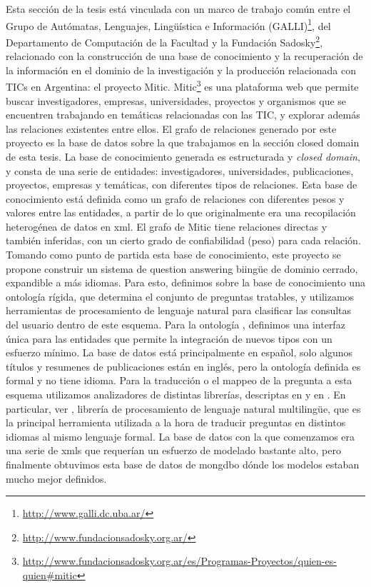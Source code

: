 Esta sección de la tesis está vinculada con un marco de trabajo común entre el
Grupo de Autómatas, Lenguajes, Lingüística e Información (GALLI)\footnote{\url{http://www.galli.dc.uba.ar/}}, 
del Departamento de Computación de la Facultad y la Fundación Sadosky\footnote{\url{http://www.fundacionsadosky.org.ar/}}, relacionado con la construcción de una base de conocimiento
 y la recuperación de la información en el dominio de la investigación y la
producción relacionada con TICs en Argentina: el proyecto Mitic.
Mitic\footnote{\url{http://www.fundacionsadosky.org.ar/es/Programas-Proyectos/quien-es-quien\#mitic}} es una plataforma web que permite buscar investigadores, empresas, universidades, proyectos y organismos que se encuentren trabajando en temáticas relacionadas con las TIC, y explorar además las relaciones existentes entre ellos. El grafo de relaciones generado por este proyecto es la base de datos sobre la que trabajamos en la sección closed domain de esta tesis.
La base de conocimiento generada es estructurada y \textit{closed domain}, y consta de
una serie de entidades: investigadores, universidades, publicaciones,
proyectos, empresas y temáticas, con diferentes tipos de relaciones.
Esta base de conocimiento está definida como un grafo de relaciones con diferentes pesos y valores entre
las entidades, a partir de lo que originalmente era una
recopilación heterogénea de datos en xml. El grafo de Mitic
tiene relaciones directas y también inferidas, con un cierto grado
de confiabilidad (peso) para cada relación. Tomando como punto de
partida esta base de conocimiento, este proyecto se propone construir
un sistema de question answering biingüe de dominio cerrado, expandible a más idiomas.
Para esto, definimos sobre la base de conocimiento una ontología
rígida, que determina el conjunto de preguntas tratables, y
utilizamos herramientas de procesamiento de lenguaje natural para
clasificar las consultas del usuario dentro de este esquema. Para la
ontología , definimos una interfaz única para las entidades que
permite la integración de nuevos tipos con un esfuerzo mínimo. 
La base de datos está principalmente en español, solo algunos títulos y resumenes de publicaciones están en inglés,
pero la ontología definida es formal y no tiene idioma. 
Para la traducción o el mappeo de la pregunta a esta esquema utilizamos 
analizadores de distintas librerías, descriptas en  y en .
En particular, ver , librería de procesamiento de lenguaje natural multilingüe, que
es la principal herramienta utilizada a la hora de traducir preguntas en distintos idiomas al mismo lenguaje formal.
La base de datos con la que comenzamos era una serie de xmls que requerían un esfuerzo de modelado bastante alto,
pero finalmente obtuvimos esta base de datos de mongdbo dónde los modelos estaban mucho mejor definidos.

